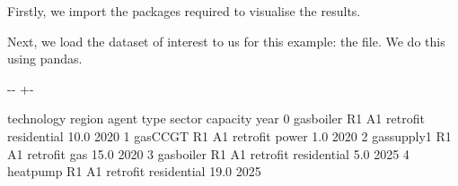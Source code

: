 \documentclass[letterpaper,10pt,english]{sphinxmanual}
\newlength\nbsphinxcodecellspacing
\begin{document}
Firstly, we import the packages required to visualise the results.

{
\begin{sphinxVerbatim}[commandchars=\\\{\}]
\llap{\color{nbsphinxin}[1]:\,\hspace{\fboxrule}\hspace{\fboxsep}}   
   
   
\end{sphinxVerbatim}
}

Next, we load the dataset of interest to us for this example: the  file. We do this using pandas.

{
\begin{sphinxVerbatim}[commandchars=\\\{\}]
\llap{\color{nbsphinxin}[2]:\,\hspace{\fboxrule}\hspace{\fboxsep}}  
\end{sphinxVerbatim}
}

{

\kern-\sphinxverbatimsmallskipamount\kern-\baselineskip
\kern+\FrameHeightAdjust\kern-\fboxrule
\vspace{\nbsphinxcodecellspacing}

\begin{sphinxVerbatim}[commandchars=\\\{\}]
\llap{\color{nbsphinxout}[2]:\,\hspace{\fboxrule}\hspace{\fboxsep}}   technology region agent      type       sector  capacity  year
0   gasboiler     R1    A1  retrofit  residential      10.0  2020
1     gasCCGT     R1    A1  retrofit        power       1.0  2020
2  gassupply1     R1    A1  retrofit          gas      15.0  2020
3   gasboiler     R1    A1  retrofit  residential       5.0  2025
4    heatpump     R1    A1  retrofit  residential      19.0  2025
\end{sphinxVerbatim}
}
\end{document}
